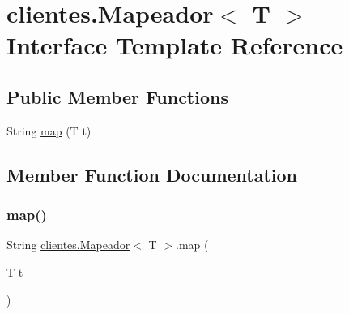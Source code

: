 \hypertarget{interfaceclientes_1_1_mapeador}{}\section{clientes.\+Mapeador$<$ T $>$ Interface Template Reference}
\label{interfaceclientes_1_1_mapeador}
\subsection*{Public Member Functions}
\begin{DoxyCompactItemize}
\item 
String \mbox{\hyperlink{interfaceclientes_1_1_mapeador_a503d8f7a0b5debb1eab28d7ff4c717f5}{map}} (T t)
\end{DoxyCompactItemize}


\subsection{Member Function Documentation}
\mbox{\label{interfaceclientes_1_1_mapeador_a503d8f7a0b5debb1eab28d7ff4c717f5}} 
\subsubsection{\texorpdfstring{map()}{map()}}
{\footnotesize\ttfamily String \mbox{\hyperlink{interfaceclientes_1_1_mapeador}{clientes.\+Mapeador}}$<$ T $>$.map (\begin{DoxyParamCaption}\item[{T}]{t }\end{DoxyParamCaption})}

